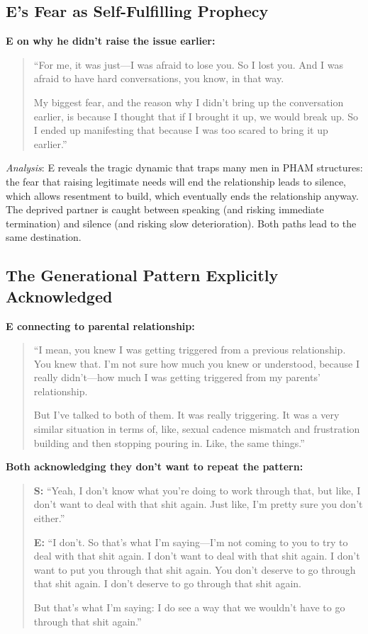 \documentclass[12pt,openany]{book}
\numberwithin{equation}{chapter}
\begin{document}
\subsection{E's Fear as Self-Fulfilling Prophecy}

\textbf{E on why he didn't raise the issue earlier:}
\begin{quote}
``For me, it was just---I was afraid to lose you. So I lost you. And I was afraid to have hard conversations, you know, in that way.

My biggest fear, and the reason why I didn't bring up the conversation earlier, is because I thought that if I brought it up, we would break up. So I ended up manifesting that because I was too scared to bring it up earlier.''
\end{quote}

\textit{Analysis}: E reveals the tragic dynamic that traps many men in PHAM structures: the fear that raising legitimate needs will end the relationship leads to silence, which allows resentment to build, which eventually ends the relationship anyway. The deprived partner is caught between speaking (and risking immediate termination) and silence (and risking slow deterioration). Both paths lead to the same destination.

\subsection{The Generational Pattern Explicitly Acknowledged}

\textbf{E connecting to parental relationship:}
\begin{quote}
``I mean, you knew I was getting triggered from a previous relationship. You knew that. I'm not sure how much you knew or understood, because I really didn't---how much I was getting triggered from my parents' relationship.

But I've talked to both of them. It was really triggering. It was a very similar situation in terms of, like, sexual cadence mismatch and frustration building and then stopping pouring in. Like, the same things.''
\end{quote}

\textbf{Both acknowledging they don't want to repeat the pattern:}
\begin{quote}
\textbf{S:} ``Yeah, I don't know what you're doing to work through that, but like, I don't want to deal with that shit again. Just like, I'm pretty sure you don't either.''

\textbf{E:} ``I don't. So that's what I'm saying---I'm not coming to you to try to deal with that shit again. I don't want to deal with that shit again. I don't want to put you through that shit again. You don't deserve to go through that shit again. I don't deserve to go through that shit again.

But that's what I'm saying: I do see a way that we wouldn't have to go through that shit again.''
\end{quote}
\end{document}
